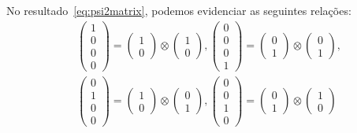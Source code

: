 No resultado~\eqref{eq:psi2matrix}, podemos evidenciar as seguintes relações:
\begin{equation}\label{eq:prodtens1}
	\begin{split}
&\begin{pmatrix}
1 \\
0 \\
0 \\
0
\end{pmatrix} = \begin{pmatrix}
1 \\
0
\end{pmatrix} \otimes \begin{pmatrix}
1 \\
0
\end{pmatrix},
\begin{pmatrix}
0 \\
0 \\
0 \\
1
\end{pmatrix} = \begin{pmatrix}
0 \\
1
\end{pmatrix} \otimes \begin{pmatrix}
0 \\
1
\end{pmatrix}, \\
&\begin{pmatrix}
0 \\
1 \\
0 \\
0
\end{pmatrix} = \begin{pmatrix}
1 \\
0
\end{pmatrix} \otimes \begin{pmatrix}
0 \\
1
\end{pmatrix},
\begin{pmatrix}
0 \\
0 \\
1 \\
0
\end{pmatrix} = \begin{pmatrix}
0 \\
1
\end{pmatrix} \otimes \begin{pmatrix}
1 \\
0
\end{pmatrix} 
	\end{split}
\end{equation}

